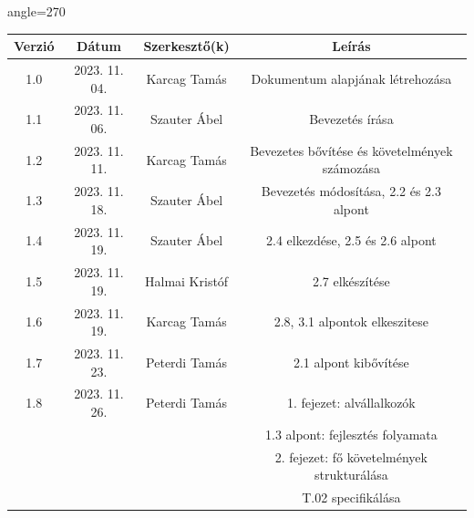 \documentclass{scrreprt}
\begin{document}
\begin{center}
      \begin{adjustbox}{angle=270}
            \begin{tabular}{|c|c|c|c|}
                  \hline
                  Verzió & Dátum         & Szerkesztő(k)      & Leírás                                                     \\
                  \hline
                  1.0    & 2023. 11. 04. & Karcag Tamás       & Dokumentum alapjának létrehozása                           \\
                  \hline
                  1.1    & 2023. 11. 06. & Szauter Ábel       & Bevezetés írása                                            \\
                  \hline
                  1.2    & 2023. 11. 11. & Karcag Tamás       & Bevezetes bővítése és követelmények számozása              \\
                  \hline
                  1.3    & 2023. 11. 18. & Szauter Ábel       & Bevezetés módosítása, 2.2 és 2.3 alpont                    \\
                  \hline
                  1.4    & 2023. 11. 19. & Szauter Ábel       & 2.4 elkezdése, 2.5 és 2.6 alpont                           \\
                  \hline
                  1.5    & 2023. 11. 19. & Halmai Kristóf     & 2.7 elkészítése                                            \\
                  \hline
                  1.6    & 2023. 11. 19. & Karcag Tamás       & 2.8, 3.1 alpontok elkeszitese                              \\
                  \hline
                  1.7    & 2023. 11. 23. & Peterdi Tamás      & 2.1 alpont kibővítése                                      \\
                  \hline
                  1.8    & 2023. 11. 26. & Peterdi Tamás      & 1. fejezet: alvállalkozók                                  \\
                         &               &                    & 1.3 alpont: fejlesztés folyamata                           \\
                         &               &                    & 2. fejezet: fő követelmények strukturálása                 \\
                         &               &                    & T.02 specifikálása                                         \\

\end{tabular}
\end{adjustbox}
\end{center}
\end{document}
